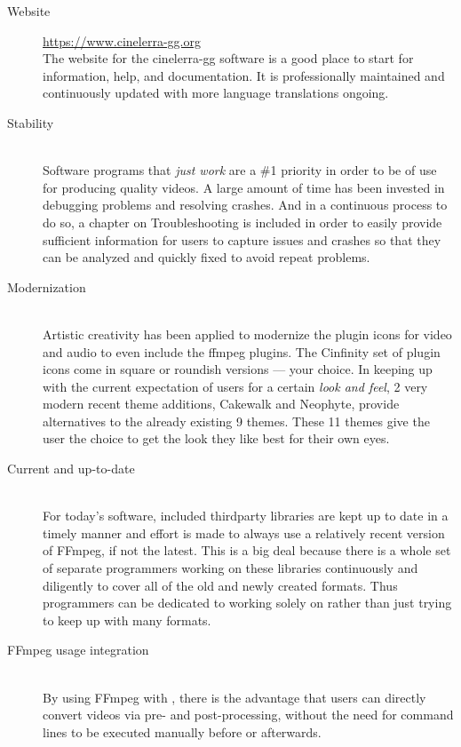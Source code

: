 \begin{description}
    \item[Website] \href{https://www.cinelerra-gg.org}{https://www.cinelerra-gg.org}\\
        The website for the cinelerra-gg software is a good place to start for information, help, and documentation.
        It is professionally maintained and continuously updated with more language
        translations ongoing.
    \item[Stability]~\\
        Software programs that \textit{just work} are a \#1 priority in order to be of use for producing quality videos.
        A large amount of time has been invested in debugging problems and resolving crashes.
        And in a continuous process to do so, a chapter on Troubleshooting is included in order to easily provide sufficient information for users to capture issues and crashes so that they can be analyzed and quickly fixed to avoid repeat problems.
    \item[Modernization]~\\
        Artistic creativity has been applied to modernize the \CGG{} plugin icons for video and audio to even include the ffmpeg plugins.
        The Cinfinity set of plugin icons come in square or roundish versions --- your choice.
        In keeping up with the current expectation of users for a certain \textit{look and feel}, 2 very modern recent theme additions, Cakewalk and Neophyte, provide alternatives to the already existing 9 themes.
        These 11 themes give the user the choice to get the look they like best for their own eyes.
    \item[Current and up-to-date]~\\
        For today’s software, included thirdparty libraries are kept up to date in a timely manner and effort is made to always use a relatively recent version of FFmpeg, if not the latest.
        This is a big deal because there is a whole set of separate programmers working on these libraries continuously and diligently to cover all of the old and newly created formats.
        Thus \CGG{} programmers can be dedicated to working solely on \CGG{} rather than just trying to keep up with many formats.
    \item[FFmpeg usage integration]~\\
        By using FFmpeg with \CGG{}, there is the advantage that users can directly convert videos via pre- and post-processing, without the need for command lines to be executed manually before or afterwards.

\end{description}
